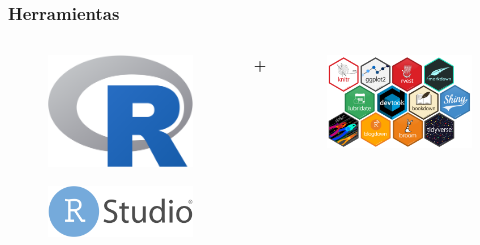 \documentclass{beamer}
\begin{document}

\begin{frame}\frametitle{Herramientas}	
	\begin{columns}
		\begin{column}{0.5\textwidth}
			\begin{figure}
				\centering
				\includegraphics[width=.5\textwidth]{logos/logo_R.png}
			\end{figure}
			\begin{figure}
				\centering
				\includegraphics[width=.7\textwidth]{images/rstudio.png}
			\end{figure}
		\end{column}
		\huge{\textbf{+}}
		\begin{column}{0.5\textwidth}
			\centering
			\begin{figure}
				\centering
				\includegraphics[width=.95\textwidth]{images/R_paquetes.png}
			\end{figure}
		\end{column}
	\end{columns}
\end{frame}
\end{document}
